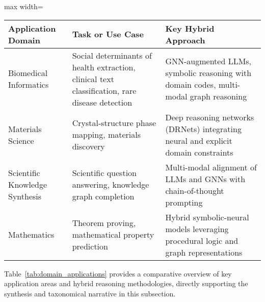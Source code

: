 \documentclass[sigconf]{acmart}
\begin{document}
\begin{table*}[htbp]
\centering
\caption{Representative Applications of Hybrid Graph-Based Reasoning Architectures}
\label{tab:domain_applications}
\begin{adjustbox}{max width=\textwidth}
\begin{tabular}{lll}
\toprule
\textbf{Application Domain} & \textbf{Task or Use Case} & \textbf{Key Hybrid Approach} \\
\midrule
Biomedical Informatics & Social determinants of health extraction, clinical text classification, rare disease detection & GNN-augmented LLMs, symbolic reasoning with domain codes, multi-modal graph reasoning \\
Materials Science & Crystal-structure phase mapping, materials discovery & Deep reasoning networks (DRNets) integrating neural and explicit domain constraints \\
Scientific Knowledge Synthesis & Scientific question answering, knowledge graph completion & Multi-modal alignment of LLMs and GNNs with chain-of-thought prompting \\
Mathematics & Theorem proving, mathematical property prediction & Hybrid symbolic-neural models leveraging procedural logic and graph representations \\
\bottomrule
\end{tabular}
\end{adjustbox}
\end{table*}

Table~\ref{tab:domain_applications} provides a comparative overview of key application areas and hybrid reasoning methodologies, directly supporting the synthesis and taxonomical narrative in this subsection.
\end{document}
